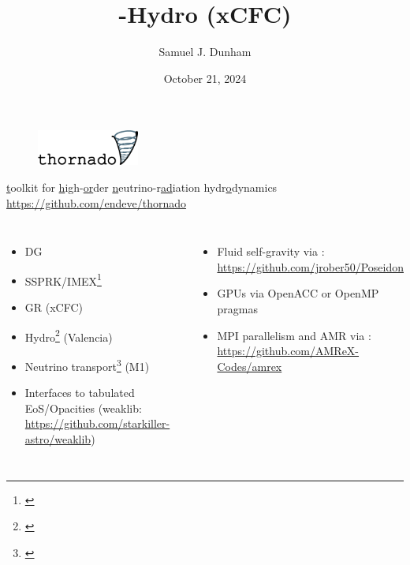 \documentclass{beamer}
\title[SXS Group Meeting]{\thornado-Hydro (xCFC)}
\author{Samuel J. Dunham}
\date{October 21, 2024}
\begin{document}
\begin{frame}

  \maketitle

\end{frame}

\begin{frame}

  \begin{figure}[ht]
    \centering
    \includegraphics[width=0.3\textwidth]{fig.thornado_logo.png}
  \end{figure}

  \begin{center}

    \ul{t}oolkit for
    \ul{h}igh-\ul{or}der
    \ul{n}eutrino-r\ul{ad}iation hydr\ul{o}dynamics\\[1em]
    \url{https://github.com/endeve/thornado}\\[1em]

  \end{center}

  \Fontvi

  \begin{columns}[c]


      \begin{itemize}
        \item
          DG
        \item
          SSPRK/IMEX\footnote{\citet{ceh2019}}
        \item
          GR (xCFC)
        \item
          Hydro\footnote{\citet{ebd2019,dem2020,pbe2021}}
          (Valencia)
        \item
          Neutrino transport\footnote{\citet{lec2021,leh2025}} (M1)
        \item
          Interfaces to tabulated EoS/Opacities
          (weaklib: \url{https://github.com/starkiller-astro/weaklib})
      \end{itemize}


      \vspace{-6em}
      \begin{itemize}
        \item
          Fluid self-gravity via \poseidon:
          \url{https://github.com/jrober50/Poseidon}
        \item
          GPUs via OpenACC or OpenMP pragmas
        \item
          MPI parallelism and AMR via \amrex:
          \url{https://github.com/AMReX-Codes/amrex}
      \end{itemize}

  \end{columns}

\end{frame}
\end{document}
